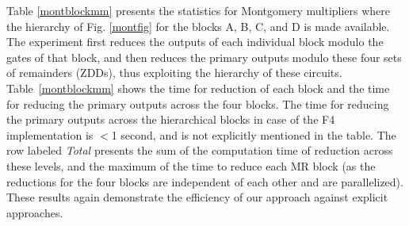 \par Table \ref{montblockmm} presents the
statistics for Montgomery multipliers where the hierarchy of
Fig. \ref{montfig} for the blocks A, B, C, and D is made
available. The experiment first reduces the outputs of each individual
block modulo the gates of that block, and then reduces the primary
outputs modulo these four sets of remainders (ZDDs), thus exploiting
the hierarchy of these circuits. Table~\ref{montblockmm} shows the time
for reduction of each block and the time for reducing the primary
outputs across the four blocks. The  time for reducing the primary
outputs across the hierarchical blocks in case of the F4
implementation is $<$1 second, and is not explicitly mentioned in the
table. The row labeled \textit{Total} presents the sum of the
computation time of 
reduction across these levels, and the maximum of the time to reduce
each MR block (as the reductions for the four blocks are independent
of each other and are parallelized). These results again demonstrate
the efficiency of our approach against explicit approaches.


